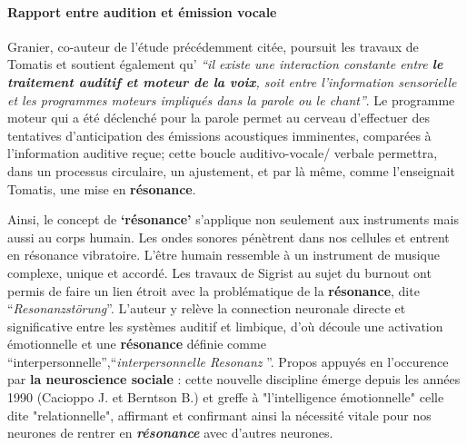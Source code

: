 \paragraph{Rapport entre audition et émission vocale}


Granier, co-auteur de l'étude  précédemment citée, poursuit les travaux de Tomatis et soutient également qu'\textit{ ``il existe une
interaction
constante entre  \textbf{le traitement auditif et moteur de la
voix}, soit entre l'information sensorielle et les programmes moteurs impliqués
dans la parole ou le chant''}\autocite{affectiveDisorders}.
Le programme moteur qui a été déclenché
pour la parole permet au cerveau d'effectuer des tentatives d'anticipation
des émissions acoustiques imminentes, comparées à l'information
auditive reçue; cette boucle
auditivo-vocale/ verbale permettra, dans un processus circulaire, un ajustement,
et par là même, comme l'enseignait Tomatis, une mise en \textbf{résonance}.

Ainsi, le concept de \textbf{`résonance'} s'applique non seulement aux instruments mais aussi au corps humain. Les ondes sonores pénètrent dans nos cellules et entrent en résonance vibratoire. L'être humain ressemble à un instrument de musique complexe, unique et accordé.
Les travaux de Sigrist au sujet du burnout ont permis de faire un lien étroit avec la problématique de la
 \textbf{résonance}, dite \enquote{\textit{Resonanzstörung}}.
L'auteur y relève la connection neuronale
directe et significative entre les systèmes auditif et
         limbique, d'où découle une activation émotionnelle et une
         \textbf{résonance} définie comme
         ``interpersonnelle'',\enquote{\textit{interpersonnelle
             Resonanz} }\autocite[55--90] {sigrist_burnout_2016}.
Propos appuyés en l'occurence par \textbf{la neuroscience sociale} \autocite[201]{van_eersel_cerveau}:  
cette nouvelle discipline émerge depuis
les années 1990 (Cacioppo J. et Berntson B.) et greffe à "l'intelligence
émotionnelle" celle dite "relationnelle", affirmant et confirmant ainsi la nécessité vitale pour nos 
neurones  de rentrer en
 \textbf{ \textit{résonance} }avec d'autres neurones.


